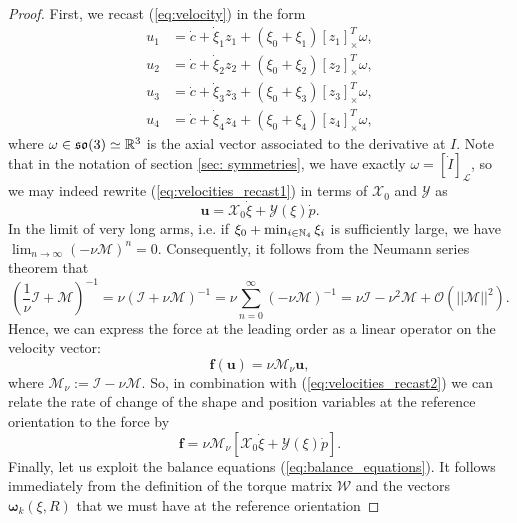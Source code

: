 \begin{proof}
First, we recast (\ref{eq:velocity}) in the form
\begin{equation}
\label{eq:velocities_recast1}
\begin{array}{lr}
	u_1 &= \dot{c} + \dot{\xi}_1 z_1 + (\xi_0 + \xi_1) [z_1]^T_{\times} \omega,\\
	u_2 &= \dot{c} + \dot{\xi}_2 z_2 + (\xi_0 + \xi_2) [z_2]^T_{\times} \omega,\\
	u_3 &= \dot{c} + \dot{\xi}_3 z_3 + (\xi_0 + \xi_3) [z_3]^T_{\times} \omega,\\
	u_4 &= \dot{c} + \dot{\xi}_4 z_4 + (\xi_0 + \xi_4) [z_4]^T_{\times} \omega,
\end{array}
\end{equation}
where $\omega \in \mathfrak{so}(3) \simeq \mathbb{R}^3$ is the axial vector associated to the derivative at $I$. Note that in the notation of section \ref{sec: symmetries}, we have exactly $\omega = [\dot{I}]_{\mathcal{L}}$, so we may indeed rewrite (\ref{eq:velocities_recast1}) in terms of $\mathcal{X}_0$ and $\mathcal{Y}$ as
\begin{equation}
\label{eq:velocities_recast2}
	\mathbf{u} = \mathcal{X}_0 \dot{\xi} + \mathcal{Y}(\xi)\dot{p}.
\end{equation}
In the limit of very long arms, i.e. if $\xi_0 + \min_{i \in \mathbb{N}_4} \xi_i$ is sufficiently large, we have $\lim_{n \to \infty}(- \nu \mathcal{M})^{n} = 0$. Consequently, it follows from the Neumann series theorem that
\begin{equation}
	(\frac{1}{\nu} \mathcal{I} + \mathcal{M})^{-1} = \nu(\mathcal{I} + \nu \mathcal{M})^{-1} = \nu \sum_{n = 0}^{\infty}(- \nu \mathcal{M})^{-1} = \nu \mathcal{I} - \nu^2 \mathcal{M} + \mathcal{O}(||\mathcal{M}||^2).
\end{equation}
Hence, we can express the force at the leading order as a linear operator on the velocity vector:
\begin{equation}
	\boldsymbol f(\mathbf{u}) = \nu \mathcal{M}_\nu \mathbf{u},
\end{equation}
where $\mathcal{M}_{\nu} := \mathcal{I} - \nu \mathcal{M}$. So, in combination with (\ref{eq:velocities_recast2}) we can relate the rate of change of the shape and position variables at the reference orientation to the force by
\begin{equation}
\label{eq:force_to_shape_and_position}
\boldsymbol f = \nu \mathcal{M}_{\nu}[\mathcal{X}_0 \dot{\xi} + \mathcal{Y}(\xi) \dot{p}].
\end{equation}
Finally, let us exploit the balance equations (\ref{eq:balance_equations}). It follows immediately from the definition of the torque matrix $\mathcal{W}$ and the vectors $\boldsymbol \omega_{k}(\xi, R)$ that we must have at the reference orientation 

\end{proof}
